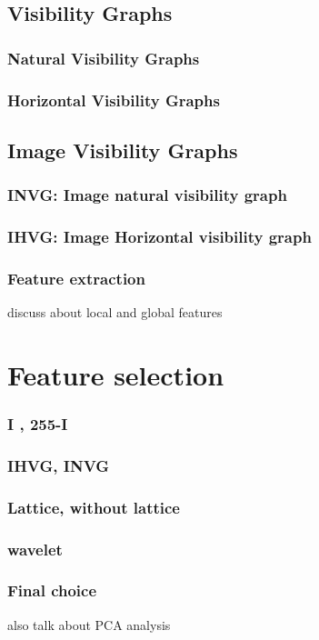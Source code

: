 \documentclass[conference]{IEEEtran}
\begin{document}
\subsection{Visibility Graphs}
\subsubsection{Natural Visibility Graphs}
\subsubsection{Horizontal Visibility Graphs}

\subsection{Image Visibility Graphs}
\subsubsection{INVG: Image natural visibility graph}
\subsubsection{IHVG: Image Horizontal visibility graph}
\subsubsection{Feature extraction }
discuss about local and global features



\section{Feature selection}
\subsubsection{I , 255-I}
\subsubsection{IHVG, INVG}
\subsubsection{Lattice, without lattice}
\subsubsection{wavelet}
\subsubsection{Final choice}
also talk about PCA analysis
\end{document}

